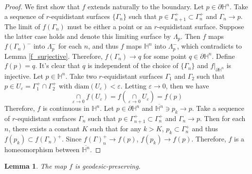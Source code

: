 \documentclass[12pt,reqno,oneside]{amsart}
\theoremstyle{plain}
\newtheorem{Lemma}{Lemma}[section]
\theoremstyle{definition}
\theoremstyle{remark}
\numberwithin{equation}{section}
\renewcommand{\H}{{\mathbb{H}^n}}
\newcommand{\Ga}{{\Gamma}}
\newcommand{\PH}{{\partial \H}}
\newcommand{\e}{{\varepsilon}}
\renewcommand{\L}{\Lambda}
\newcommand{\below}[2]{{\mathop{#1}\limits_{#2}}}
\newcommand{\thin}[1]{{{#1}}}
\newcommand{\thick}[1]{{{#1}}}
\newcommand{\diam}{{\text{diam}}}
\begin{document}
\begin{proof}
	We first show that $f$ extends naturally to the boundary.  Let $p \in \PH$.
	Take a sequence of $r$-equidistant surfaces $\{\Ga_n\}$ such that
	$p \in \thick{\Ga^+_{n+1}}\subset \thick{\Ga^+_n}$ and $\Ga_n \to p$. The limit of $f(\Ga_n)$ must be either a point or an $r$-equidistant surface.  Suppose the latter
	case holds and denote this limiting surface by $\L_p$.  Then $f$ maps
	$\thin{f(\Ga_n)^-}$ into $\thin{\L^-_p}$ for each $n$, and thus $f$ maps $\H$ into $\L^-_p$, which contradicts to Lemma
	\eqref{f_surjective}.  Therefore, $f(\Ga_n) \to q$ for some point $q \in
	\PH$. Define $f(p)=q$.  It's clear that $q$ is independent of
	the choice of $\{\Ga_n\}$ and $f|_\PH$ is injective.  Let $p \in \H$.  Take two $r$-equidistant surfaces
	$\Ga_1$ and $\Ga_2$ such that $p \in U_\e=\thick{\Ga^+_1} \cap \thick{\Ga^+_2}$ with
	$\diam(U_\e) < \e$.  Letting $\e \to 0$, then
	we have
	\begin{equation}
		\below{\cap}{\e\to0}f(U_\e)=f(\below{\cap}{\e\to0}U_\e)=f(p)
	\end{equation}
	Therefore, $f$ is continuous in $\H$.  Let $p \in \PH$ and $\overline{\H}
	\ni p_k \to p$.  Take a sequence of $r$-equidistant surfaces $\Ga_n$ such
	that $p \in \thick{\Ga^+_{n+1}}\subset \thick{\Ga^+_n}$ and $\Ga_n\to p$.  Then
	for each $n$,
	there exists a constant $K$ such that for any $k>K$, $p_k \subset \Ga_n^+$ and thus $f(p_k) \subset
	\thick{f(\Ga_n)^+}$.  Since $\thick{f(\Ga)^+_n} \to f(p)$, $f(p_k)\to f(p)$.
	Therefore, $f$ is a homeomorphism between $\overline{\H}$.
\end{proof}
\begin{Lemma}\label{f_geodesic_preserving}
	The map $f$ is geodesic-preserving.
\end{Lemma}
\end{document}
